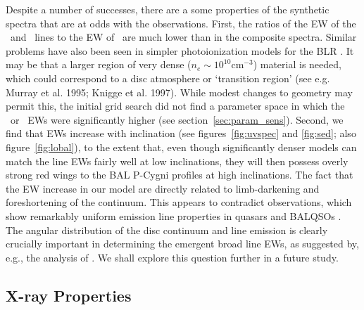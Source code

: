 \documentclass[useAMS,usenatbib]{mn2e_x}
\begin{document}

Despite a number of successes, 
there are a some properties of the synthetic spectra
that are at odds with the observations. First, the ratios of the 
EW of the \la\ and \mgline\ lines
to the EW of \civline\ are much lower than in the composite spectra. 
Similar problems have also been seen in simpler photoionization models for the 
BLR \citep{netzer1990}.
It may be that a larger region of very dense ($n_e\sim10^{10}$cm$^{-3}$) 
material is needed, which could correspond to a disc atmosphere or 
`transition region' 
(see e.g. Murray et al. 1995; Knigge et al. 1997). \nocite{knigge1998} 
While modest changes to geometry may permit this, the initial grid search 
did not find a parameter space in which the \la\ or \mg\ EWs
were significantly higher (see section~\ref{sec:param_sens}). 
Second, we find that EWs increase with inclination 
(see figures~\ref{fig:uvspec} and \ref{fig:sed}; also figure~\ref{fig:lobal}), 
to the extent that, even though significantly denser
models can match the line EWs fairly well at low inclinations, they will then
possess overly strong red wings to the BAL P-Cygni profiles at high inclinations.
The fact that the EW increase in our model are directly related to limb-darkening 
and foreshortening of the continuum. 
This appears to contradict observations, which show remarkably uniform emission
line properties in quasars and BALQSOs \citep{weymann1991,dipompeo2012b}. 
The angular distribution of the disc 
continuum and line emission is clearly crucially important in determining the emergent broad 
line EWs, as suggested by, e.g., the analysis of \cite{risaliti2011}. 
We shall explore this question further in a future study.  


\subsection{X-ray Properties}
\label{sec:xray}
\end{document}
